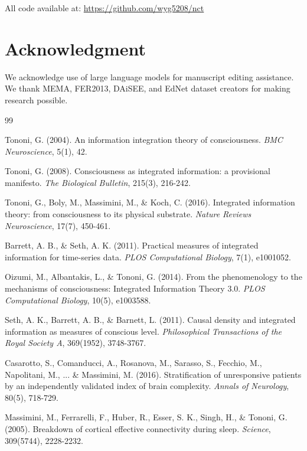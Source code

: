 \documentclass[10pt,journal,compsoc]{IEEEtran}
\begin{document}
All code available at: \url{https://github.com/wyg5208/nct}

\section*{Acknowledgment}

We acknowledge use of large language models for manuscript editing assistance. We thank MEMA, FER2013, DAiSEE, and EdNet dataset creators for making research possible.

\ifCLASSOPTIONcaptionsoff
  \newpage
\fi

\begin{thebibliography}{99}

Tononi, G. (2004). An information integration theory of consciousness. \textit{BMC Neuroscience}, 5(1), 42.

Tononi, G. (2008). Consciousness as integrated information: a provisional manifesto. \textit{The Biological Bulletin}, 215(3), 216-242.

Tononi, G., Boly, M., Massimini, M., \& Koch, C. (2016). Integrated information theory: from consciousness to its physical substrate. \textit{Nature Reviews Neuroscience}, 17(7), 450-461.

Barrett, A. B., \& Seth, A. K. (2011). Practical measures of integrated information for time-series data. \textit{PLOS Computational Biology}, 7(1), e1001052.

Oizumi, M., Albantakis, L., \& Tononi, G. (2014). From the phenomenology to the mechanisms of consciousness: Integrated Information Theory 3.0. \textit{PLOS Computational Biology}, 10(5), e1003588.

Seth, A. K., Barrett, A. B., \& Barnett, L. (2011). Causal density and integrated information as measures of conscious level. \textit{Philosophical Transactions of the Royal Society A}, 369(1952), 3748-3767.

Casarotto, S., Comanducci, A., Rosanova, M., Sarasso, S., Fecchio, M., Napolitani, M., ... \& Massimini, M. (2016). Stratification of unresponsive patients by an independently validated index of brain complexity. \textit{Annals of Neurology}, 80(5), 718-729.

Massimini, M., Ferrarelli, F., Huber, R., Esser, S. K., Singh, H., \& Tononi, G. (2005). Breakdown of cortical effective connectivity during sleep. \textit{Science}, 309(5744), 2228-2232.


\end{thebibliography}
\end{document}
